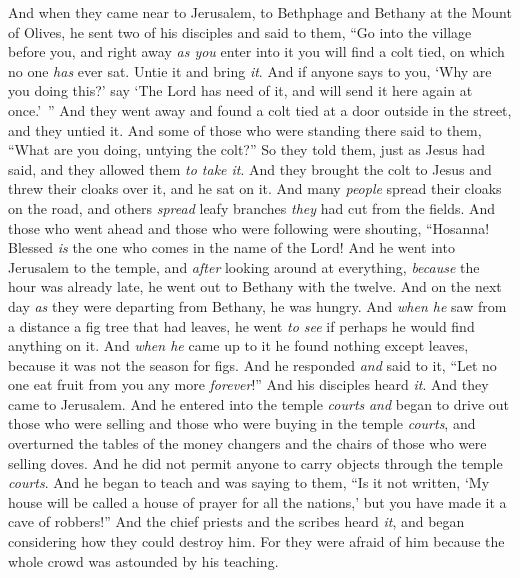 \begin{biblechapter} %
 And when they came near to Jerusalem, to Bethphage and Bethany at the Mount of Olives, he sent two of his disciples
\verse and said to them, “Go into the village before you, and right away \textit{as you} enter into it you will find a colt tied, on which no one \textit{has} ever sat. Untie it and bring \textit{it}.
\verse And if anyone says to you, ‘Why are you doing this?’ say ‘The Lord has need of it, and will send it here again at once.’ ”
\verse And they went away and found a colt tied at a door outside in the street, and they untied it.
\verse And some of those who were standing there said to them, “What are you doing, untying the colt?”
\verse So they told them, just as Jesus had said, and they allowed them \textit{to take it}.
\verse And they brought the colt to Jesus and threw their cloaks over it, and he sat on it.
\verse And many \textit{people} spread their cloaks on the road, and others \textit{spread} leafy branches \textit{they} had cut from the fields.
\verse And those who went ahead and those who were following were shouting,
\verse “Hosanna! 
Blessed \textit{is} the one who comes in the name of the Lord!
\verse And he went into Jerusalem to the temple, and \textit{after} looking around at everything, \textit{because} the hour was already late, he went out to Bethany with the twelve.
 And on the next day \textit{as} they were departing from Bethany, he was hungry.
\verse And \textit{when he} saw from a distance a fig tree that had leaves, he went \textit{to see} if perhaps he would find anything on it. And \textit{when he} came up to it he found nothing except leaves, because it was not the season for figs.
\verse And he responded \textit{and} said to it, “Let no one eat fruit from you any more \textit{forever}!” And his disciples heard \textit{it}.
 And they came to Jerusalem. And he entered into the temple \textit{courts} \textit{and} began to drive out those who were selling and those who were buying in the temple \textit{courts}, and overturned the tables of the money changers and the chairs of those who were selling doves.
\verse And he did not permit anyone to carry objects through the temple \textit{courts}.
\verse And he began to teach and was saying to them, “Is it not written, ‘My house will be called a house of prayer 
for all the nations,’
\verse but you have made it a cave of robbers!”
\verse And the chief priests and the scribes heard \textit{it}, and began considering how they could destroy him. For they were afraid of him because the whole crowd was astounded by his teaching.

\end{biblechapter}
